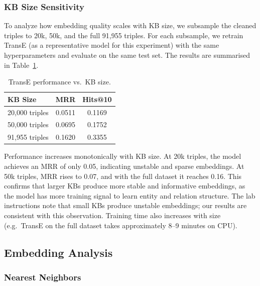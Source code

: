\documentclass[11pt,a4paper]{article}
\begin{document}
  \subsubsection{KB Size Sensitivity}

  To analyze how embedding quality scales with KB size, we subsample the cleaned triples to 20k, 50k, and the full 91,955 triples. For each subsample, we retrain TransE (as a representative model for this experiment) with the same hyperparameters and evaluate on the same test set. The results are summarised in Table~\ref{tab:kbsize}.

  \begin{table}[ht]
  \centering
  \caption{TransE performance vs.\ KB size.}
  \label{tab:kbsize}
  \begin{tabular}{lcc}
  \toprule
  \textbf{KB Size} & \textbf{MRR} & \textbf{Hits@10} \\
  \midrule
  20,000 triples & 0.0511 & 0.1169 \\
  50,000 triples & 0.0695 & 0.1752 \\
  91,955 triples & 0.1620 & 0.3355 \\
  \bottomrule
  \end{tabular}
  \end{table}

  Performance increases monotonically with KB size. At 20k triples, the model achieves an MRR of only 0.05, indicating unstable and sparse embeddings. At 50k triples, MRR rises to 0.07, and with the full dataset it reaches 0.16. This confirms that larger KBs produce more stable and informative embeddings, as the model has more training signal to learn entity and relation structure. The lab instructions note that small KBs produce unstable embeddings; our results are consistent with this observation. Training time also increases with size (e.g.\ TransE on the full dataset takes approximately 8--9 minutes on CPU).

  \subsection{Embedding Analysis}

  \subsubsection{Nearest Neighbors}
\end{document}
